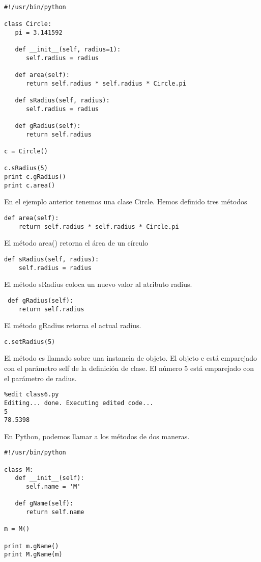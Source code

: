 \documentclass[twoside,10.5pt]{article}%
\begin{document}
\begin{verbatim}
#!/usr/bin/python

class Circle:
   pi = 3.141592

   def __init__(self, radius=1):
      self.radius = radius 

   def area(self):
      return self.radius * self.radius * Circle.pi

   def sRadius(self, radius):
      self.radius = radius

   def gRadius(self):
      return self.radius

c = Circle()

c.sRadius(5)
print c.gRadius()
print c.area()
\end{verbatim}


En el ejemplo anterior tenemos una clase Circle. Hemos definido tres m\'etodos

\begin{verbatim}
def area(self):
    return self.radius * self.radius * Circle.pi
\end{verbatim}


El m\'etodo area() retorna el \'area de un c\'irculo

\begin{verbatim}
def sRadius(self, radius):
    self.radius = radius
\end{verbatim}

El m\'etodo sRadius coloca un nuevo valor al atributo radius.

\begin{verbatim}
 def gRadius(self):
    return self.radius
\end{verbatim}

El m\'etodo gRadius retorna el actual radius.

\begin{verbatim}
c.setRadius(5)
\end{verbatim}

El m\'etodo es llamado sobre una instancia de objeto. El objeto c est\'a emparejado con el par\'ametro self de la definici\'on de clase. El n\'umero 5 est\'a emparejado con el par\'ametro de radius.

\begin{verbatim}
%edit class6.py
Editing... done. Executing edited code...
5
78.5398
\end{verbatim}


En Python, podemos llamar a los m\'etodos de dos maneras. 

\begin{verbatim}
#!/usr/bin/python

class M:
   def __init__(self):
      self.name = 'M'

   def gName(self):
      return self.name
      
m = M()

print m.gName()
print M.gName(m)
\end{verbatim}
\end{document}
